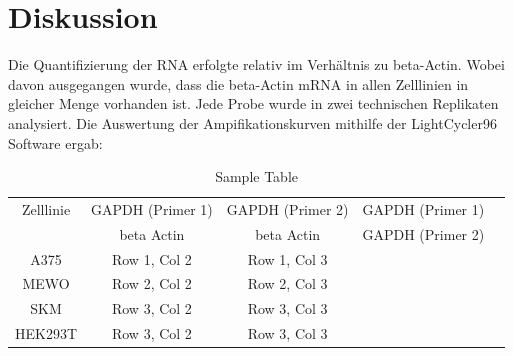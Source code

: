 \documentclass{article}
\begin{document}
\section{Diskussion}

Die Quantifizierung der RNA erfolgte relativ im Verhältnis zu beta-Actin. Wobei davon ausgegangen wurde, dass die beta-Actin mRNA in allen Zelllinien in gleicher Menge vorhanden ist. Jede Probe wurde in zwei technischen Replikaten analysiert. Die Auswertung der Ampifikationskurven mithilfe der LightCycler96 Software ergab:

\begin{table}[h!]
    \centering
    \begin{tabular}{ | c | c|c |c|c } 
      \hline
      Zelllinie & GAPDH (Primer 1) & GAPDH (Primer 2) & GAPDH (Primer 1)  \\ 
      & beta Actin & beta Actin & GAPDH (Primer 2)  \\ 
      \hline
      A375 & Row 1, Col 2 & Row 1, Col 3& \\ 
      \hline
      MEWO & Row 2, Col 2 & Row 2, Col 3& \\ 
      \hline
      SKM & Row 3, Col 2 & Row 3, Col 3& \\ 
      \hline
      
      HEK293T & Row 3, Col 2 & Row 3, Col 3& \\ 
      \hline
    \end{tabular}
    \caption{Sample Table}
    \label{table:1}
    \end{table}



\end{document}
